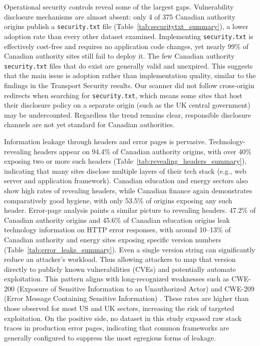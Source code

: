 \documentclass[pdflatex,sn-mathphys-num]{sn-jnl}
\numberwithin{equation}{section}
\theoremstyle{thmstyleone}
\theoremstyle{thmstyletwo}%
\theoremstyle{thmstylethree}%
\begin{document}
\vspace{1em}Operational security controls reveal some of the largest gaps. Vulnerability disclosure mechanisms 
are almost absent: only 4 of 375 Canadian authority origins publish a \texttt{security.txt} file 
(Table~\ref{tab:securitytxt_summary}), a 
lower adoption rate than every other dataset examined. Implementing \texttt{security.txt} is effectively cost-free and requires no 
application code changes, yet nearly 99\% of Canadian authority sites still fail to deploy it.
The few Canadian authority \texttt{security.txt} files that do exist are generally valid and 
unexpired. This suggests that the main issue is adoption rather than implementation quality, similar to the findings in
the Transport Security results. Our scanner did not 
follow cross-origin redirects when searching for \texttt{security.txt}, which means some sites that host their 
disclosure policy on a separate origin (such as the UK central government) may be undercounted. Regardless
the trend remains clear, responsible disclosure channels are not yet standard for Canadian 
authorities.

\vspace{1em}Information leakage through headers and error pages is pervasive. 
Technology-revealing headers appear on 94.4\% of Canadian authority origins, with over 40\% 
exposing two or more such headers (Table~\ref{tab:revealing_headers_summary}), indicating that many sites disclose multiple layers of their tech stack (e.g., web 
server and application framework). Canadian education and energy sectors also 
show high rates of 
revealing headers, while Canadian finance again demonstrates comparatively good hygiene, with only 53.5\% of 
origins exposing any such header. Error-page analysis paints a similar picture to revealing headers. 
47.2\% of Canadian authority origins and 45.6\% of Canadian education origins leak technology information on 
HTTP error responses, with around 10--13\% of Canadian authority and energy sites exposing specific version 
numbers (Table~\ref{tab:error_leaks_summary}). Even a single version string can significantly reduce an attacker’s 
workload. Thus allowing attackers to map that version directly to publicly known 
vulnerabilities (CVEs) and potentially automate exploitation. 
This pattern aligns with long-recognized weaknesses such as CWE-200 (Exposure of 
Sensitive Information to an Unauthorized Actor) and CWE-209 (Error Message 
Containing Sensitive Information) \cite{cwe_200, cwe_209}. These rates are higher than those observed for most US and UK sectors, 
increasing the risk of targeted exploitation. On the positive side, no dataset in this study exposed raw stack
traces in production error pages, indicating that common frameworks are generally configured to suppress the most
egregious forms of leakage.
\end{document}
